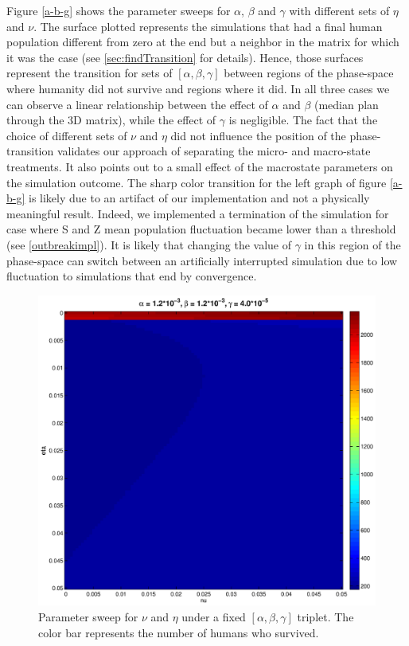 \documentclass[11pt]{article} %
\begin{document}
Figure \ref{a-b-g} shows the parameter sweeps for $\alpha$, $\beta$ and $\gamma$ with different sets of $\eta$ and $\nu$. The surface plotted represents the simulations that had a final human population different from zero at the end but a neighbor in the matrix for which it was the case (see \ref{sec:findTransition} for details). Hence, those surfaces represent the transition for sets of $[\alpha, \beta, \gamma]$ between regions of the phase-space where humanity did not survive and regions where it did. In all three cases we can observe a linear relationship between the effect of $\alpha$ and $\beta$ (median plan through the 3D matrix), while the effect of $\gamma$ is negligible. The fact that the choice of different sets of $\nu$ and $\eta$ did not influence the position of the phase-transition validates our approach of separating the micro- and macro-state treatments. It also points out to a small effect of the macrostate parameters on the simulation outcome. The sharp color transition for the left graph of figure \ref{a-b-g} is likely due to an artifact of our implementation and not a physically meaningful result. Indeed, we implemented a termination of the simulation for case where S and Z mean population fluctuation became lower than a threshold (see \ref{outbreakimpl}). It is likely that changing the value of $\gamma$ in this region of the phase-space can switch between an artificially interrupted simulation due to low fluctuation to simulations that end by convergence. 

\begin{figure}[h!]
\centerline{
\includegraphics[scale=0.33]{../images/Matlab_figures/nu-eta-sweep.eps}}
\caption{Parameter sweep for $\nu$ and $\eta$ under a fixed  $[\alpha, \beta, \gamma]$ triplet. The color bar represents the number of humans who survived.  \label{nueta} }
\end{figure}
\end{document}
